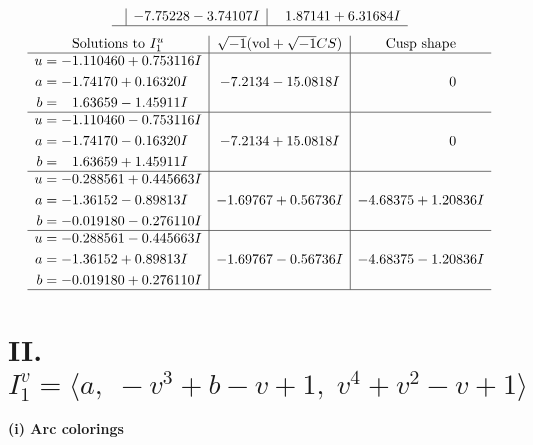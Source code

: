 \documentclass[1p]{elsarticle_modified}
\theoremstyle{definition}
\newcommand{\I}{\sqrt{-1}}
\begin{document}
$$\begin{array}{c|c|c}
 & -7.75228 - 3.74107 I & \phantom{-}1.87141 + 6.31684 I\\
 \hline 
 \end{array}$$\newpage$$\begin{array}{c|c|c}  
\text{Solutions to }I^u_{1}& \I (\text{vol} + \sqrt{-1}CS) & \text{Cusp shape}\\
 \hline 
\begin{aligned}
u &= -1.110460 + 0.753116 I \\
a &= -1.74170 + 0.16320 I \\
b &= \phantom{-}1.63659 - 1.45911 I\end{aligned}
 & -7.2134 - 15.0818 I & \phantom{-0.000000 } 0 \\ \hline\begin{aligned}
u &= -1.110460 - 0.753116 I \\
a &= -1.74170 - 0.16320 I \\
b &= \phantom{-}1.63659 + 1.45911 I\end{aligned}
 & -7.2134 + 15.0818 I & \phantom{-0.000000 } 0 \\ \hline\begin{aligned}
u &= -0.288561 + 0.445663 I \\
a &= -1.36152 - 0.89813 I \\
b &= -0.019180 - 0.276110 I\end{aligned}
 & -1.69767 + 0.56736 I & -4.68375 + 1.20836 I \\ \hline\begin{aligned}
u &= -0.288561 - 0.445663 I \\
a &= -1.36152 + 0.89813 I \\
b &= -0.019180 + 0.276110 I\end{aligned}
 & -1.69767 - 0.56736 I & -4.68375 - 1.20836 I\\
 \hline 
 \end{array}$$\newpage\newpage\renewcommand{\arraystretch}{1}
\centering \section*{II. $I^v_{1}= \langle a,\;- v^3+b- v+1,\;v^4+v^2- v+1 \rangle$}
\flushleft \textbf{(i) Arc colorings}\\
\end{document}
